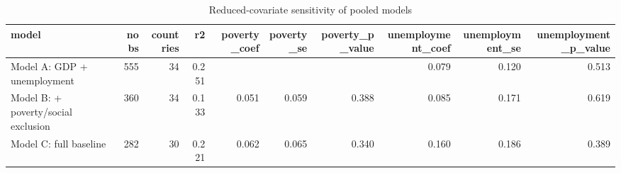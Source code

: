 \begin{table}
\caption{Reduced-covariate sensitivity of pooled models}
\label{tab:regression_sensitivity_covariate}
\begin{tabular}{lrrrrrrrrr}
\toprule
model & nobs & countries & r2 & poverty\_coef & poverty\_se & poverty\_p\_value & unemployment\_coef & unemployment\_se & unemployment\_p\_value \\
\midrule
Model A: GDP + unemployment & 555 & 34 & 0.251 &  &  &  & 0.079 & 0.120 & 0.513 \\
Model B: + poverty/social exclusion & 360 & 34 & 0.133 & 0.051 & 0.059 & 0.388 & 0.085 & 0.171 & 0.619 \\
Model C: full baseline & 282 & 30 & 0.221 & 0.062 & 0.065 & 0.340 & 0.160 & 0.186 & 0.389 \\
\bottomrule
\end{tabular}
\end{table}

